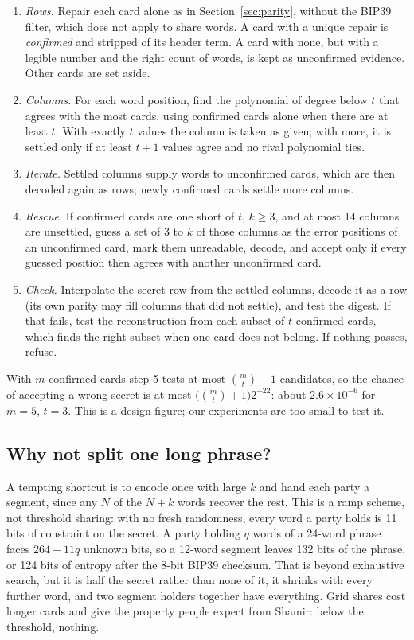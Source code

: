 \documentclass[numeric]{anvil-paper}
\begin{document}
\begin{enumerate}
\item \emph{Rows.} Repair each card alone as in Section~\ref{sec:parity},
  without the BIP39 filter, which does not apply to share words. A card with a
  unique repair is \emph{confirmed} and stripped of its header term. A card
  with none, but with a legible number and the right count of words, is kept
  as unconfirmed evidence. Other cards are set aside.
\item \emph{Columns.} For each word position, find the polynomial of degree
  below $t$ that agrees with the most cards, using confirmed cards alone when
  there are at least $t$. With exactly $t$ values the column is taken as given;
  with more, it is settled only if at least $t+1$ values agree and no rival
  polynomial ties.
\item \emph{Iterate.} Settled columns supply words to unconfirmed cards, which
  are then decoded again as rows; newly confirmed cards settle more columns.
\item \emph{Rescue.} If confirmed cards are one short of $t$, $k\ge 3$, and at
  most 14 columns are unsettled, guess a set of 3 to $k$ of those columns as
  the error positions of an unconfirmed card, mark them unreadable, decode, and
  accept only if every guessed position then agrees with another unconfirmed
  card.
\item \emph{Check.} Interpolate the secret row from the settled columns, decode
  it as a row (its own parity may fill columns that did not settle), and test
  the digest. If that fails, test the reconstruction from each subset of $t$
  confirmed cards, which finds the right subset when one card does not
  belong. If nothing passes, refuse.
\end{enumerate}

With $m$ confirmed cards step 5 tests at most $\binom{m}{t}+1$ candidates, so
the chance of accepting a wrong secret is at most
$\bigl(\binom{m}{t}+1\bigr)2^{-22}$: about $2.6\times10^{-6}$ for $m=5$,
$t=3$. This is a design figure; our experiments are too small to test it.

\subsection{Why not split one long phrase?}
\label{sec:ramp}

A tempting shortcut is to encode once with large $k$ and hand each party a
segment, since any $N$ of the $N+k$ words recover the rest. This is a ramp
scheme, not threshold sharing: with no fresh randomness, every word a party
holds is 11 bits of constraint on the secret. A party holding $q$ words of a
24-word phrase faces $264-11q$ unknown bits, so a 12-word segment leaves 132
bits of the phrase, or 124 bits of entropy after the 8-bit BIP39 checksum. That
is beyond exhaustive search, but it is half the secret rather than none of it,
it shrinks with every further word, and two segment holders together have
everything. Grid shares cost longer cards and give the property people expect
from Shamir: below the threshold, nothing.
\end{document}
